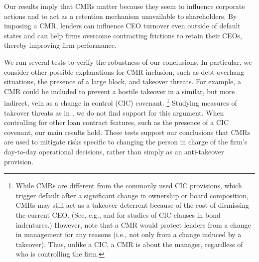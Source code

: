 \documentclass[a4paper,12pt]{article}
\begin{document}
Our results imply that CMRs matter because they seem to influence corporate actions and to act as a retention mechanism unavailable to shareholders.
By imposing a CMR, lenders can influence CEO turnover even outside of default states and can help firms overcome contracting frictions to retain their CEOs, thereby improving firm performance.  



We run several tests to verify the robustness of our conclusions. 
In particular, we consider other possible explanations for CMR inclusion, such as debt overhang situations, the presence of a large block, and takeover threats.
For example, a CMR could be included to prevent a hostile takeover in a similar, but more indirect, vein as a change in control (CIC) covenant.%
    \footnote{While CMRs are different from the commonly used CIC provisions, which trigger default after a significant change in ownership or board composition, CMRs may still act as a takeover deterrent because of the cost of dismissing the current CEO.
    (See, e.g., \cite{cook_1994} and \cite{Billett_2004} for studies of CIC clauses in bond indentures.)
    However, note that a CMR would protect lenders from a change in management for any reasons (i.e., not only from a change induced by a takeover).
    Thus, unlike a CIC, a CMR is about the manager, regardless of who is controlling the firm.
    }
Studying measures of takeover threats as in \cite{Agrawal_1998}, we do not find support for this argument.
When controlling for other loan contract features, such as the presence of a CIC covenant, our main results hold.
These tests support our conclusions that CMRs are used to mitigate risks specific to changing the person in charge of the firm's day-to-day operational decisions, rather than simply as an anti-takeover provision.
\end{document}
